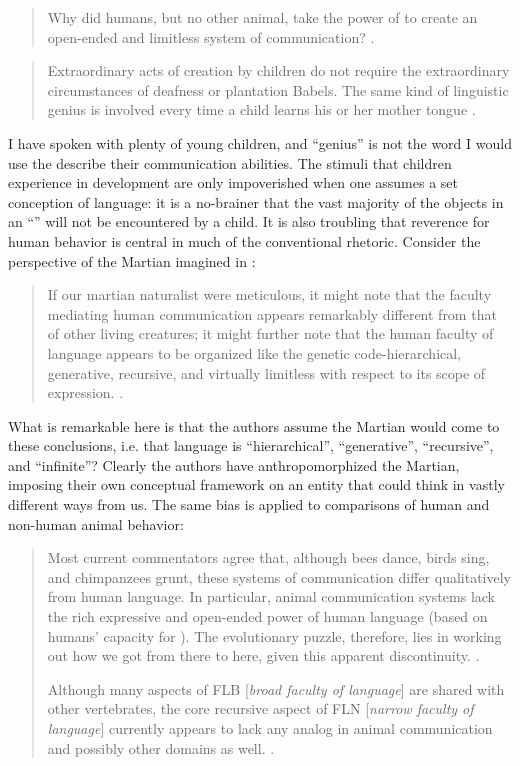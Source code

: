 \begin{quote}
Why did humans, but no other animal, take the power of  to create an open-ended and limitless system of communication? \citep{HauserEtAl2002}.
\end{quote}

\begin{quote} 
Extraordinary acts of creation by children do not require the extraordinary circumstances of deafness or plantation Babels. The same kind of linguistic genius is involved every time a child learns his or her mother tongue \citep{Pinker2003}.
\end{quote}

  I have spoken with plenty of young children, and “genius” is not the word I would use the describe their communication abilities. The stimuli that children experience in development are only impoverished when one assumes a set conception of language: it is a no-brainer that the vast majority of the objects in an “” will not be encountered by a child. It is also troubling that reverence for human behavior is central in much of the conventional rhetoric. Consider the perspective of the Martian imagined in \citet{HauserEtAl2002}:


\begin{quote}
If our martian naturalist were meticulous, it might note that the faculty mediating human communication appears remarkably different from that of other living creatures; it might further note that the human faculty of language appears to be organized like the genetic code-hierarchical, generative, recursive, and virtually limitless with respect to its scope of expression. \citep{HauserEtAl2002}.
\end{quote}

  What is remarkable here is that the authors assume the Martian would come to these conclusions, i.e. that language is “hierarchical”, “generative”, “recursive”, and “infinite”? Clearly the authors have anthropomorphized the Martian, imposing their own conceptual framework on an entity that could think in vastly different ways from us. The same bias is applied to comparisons of human and non-human animal behavior:

\begin{quote}
Most current commentators agree that, although bees dance, birds sing, and chimpanzees grunt, these systems of communication differ qualitatively from human language. In particular, animal communication systems lack the rich expressive and open-ended power of human language (based on humans' capacity for ). The evolutionary puzzle, therefore, lies in working out how we got from there to here, given this apparent discontinuity. \citep{HauserEtAl2002}.

Although many aspects of FLB [\textit{broad faculty of language}] are shared with other vertebrates, the core recursive aspect of FLN [\textit{narrow faculty of language}] currently appears to lack any analog in animal communication and possibly other domains as well. \citep{HauserEtAl2002}.
\end{quote}

